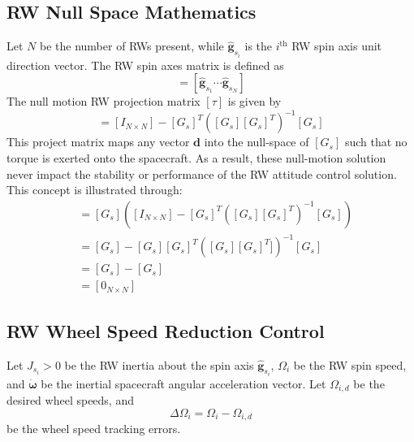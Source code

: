 \subsection{RW Null Space Mathematics}
Let $N$ be the number of RWs present, while $\hat{\bm g}_{s_{i}}$ is the $i^{\text{th}}$ RW spin axis unit direction vector.  The RW spin axes matrix is defined as
\begin{equation}
	[G_{s}] = [\hat{\bm g}_{s_{1}} \cdots \hat{\bm g}_{s_{N}}]
\end{equation}
The null motion RW projection matrix $[\tau]$ is given by\cite{schaub}
\begin{equation}
	[\tau] = [I_{N\times N}] - [G_{s}]^{T} \left( [G_{s}] [G_{s}]^{T} \right)^{-1} [G_{s}]
\end{equation}
This project matrix maps any vector $\bm d$ into the null-space of $[G_{s}]$ such that no torque is exerted onto the spacecraft.  As a result, these null-motion solution never impact the stability or performance of the RW attitude control solution.  This concept is illustrated through:
\begin{align*}
	[G_{s}] [\tau] &= [G_{s}] \left( [I_{N\times N}] - [G_{s}]^{T} \left( [G_{s}] [G_{s}]^{T} \right)^{-1} [G_{s}] \right)
	\\
	&= [G_{s}] - [G_{s}] [G_{s}]^{T} \left( [G_{s}] [G_{s}]^{T}] \right)^{-1} [G_{s}] \\
	&= [G_{s}] - [G_{s}] \\
	&= [0_{N\times N}]
\end{align*}


\subsection{RW Wheel Speed Reduction Control}
Let $J_{s_{i}}>0$ be the RW inertia about the spin axis $\hat{\bm g}_{s_{i}}$, $\Omega_{i}$ be the RW spin speed, and $\dot{\bm \omega}$ be the inertial spacecraft angular acceleration vector.  Let $\Omega_{i,d}$ be the desired wheel speeds, and
\begin{equation}
	\Delta\Omega_i = \Omega_i - \Omega_{i,d}
\end{equation}
 be the wheel speed tracking errors.  
 
